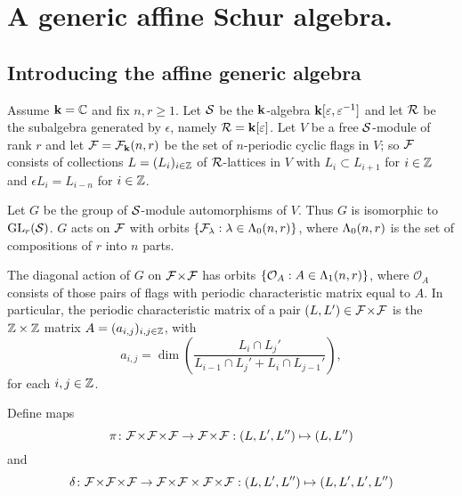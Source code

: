 \documentclass[a4paper, 11pt]{report}
\begin{document}
\chapter{A generic affine Schur algebra.}

\section{Introducing the affine generic algebra}

Assume $\mathbf{k} = \mathbb{C}$ and fix $n,r\geq 1$. Let $\mathcal{S}$ be the $\mathbf{k}$-algebra $\mathbf{k}[\varepsilon,\varepsilon^{-1}]$ and let $\mathcal{R}$ be the subalgebra generated by $\epsilon$, namely $\mathcal{R}=\mathbf{k}[\varepsilon]$. Let $V$ be a free $\mathcal{S}$-module of rank $r$ and let $\mathcal{F} = \mathcal{F}_{\mathbf{k}}(n,r)$ be the set of $n$-periodic cyclic flags in $V$; so $\mathcal{F}$ consists of collections $L = (L_i)_{i\in\mathbb{Z}}$ of $\mathcal{R}$-lattices in $V$ with $L_i\subset L_{i+1}$ for $i\in\mathbb{Z}$ and $\epsilon L_i = L_{i-n}$ for $i\in\mathbb{Z}$.

Let $G$ be the group of $\mathcal{S}$-module automorphisms of $V$. Thus $G$ is isomorphic to $\operatorname{GL}_{r}(\mathcal{S})$. $G$ acts on $\mathcal{F}$ with orbits $\{\mathcal{F}_\lambda:\lambda\in\Lambda_0(n,r)\}$, where $\Lambda_0(n,r)$ is the set of compositions of $r$ into $n$ parts.

The diagonal action of $G$ on ${\mathcal{F}\!\times\!\mathcal{F}}$ has orbits $\{\mathcal{O}_A:A\in\Lambda_1(n,r)\}$, where $\mathcal{O}_A$ consists of those pairs of flags with {\color{blue}periodic characteristic matrix} equal to $A$. In particular, the periodic characteristic matrix of a pair $(L,L')\in{\mathcal{F}\!\times\!\mathcal{F}}$ is the $\mathbb{Z}\times\mathbb{Z}$ matrix $A = (a_{i,j})_{i,j\in\mathbb{Z}}$, with
\begin{equation*}
a_{i,j} = \dim\left(\frac{L_i\cap L_j'}{L_{i-1}\cap L_j' + L_i\cap L_{j-1}'}\right),
\end{equation*}
for each $i,j\in\mathbb{Z}$.


\dashedline

Define maps
\begin{equation*}
\pi\colon {\mathcal{F}\!\times\!\mathcal{F}\!\times\!\mathcal{F}}\to{\mathcal{F}\!\times\!\mathcal{F}}: (L,L',L'')\mapsto (L,L'')
\end{equation*}
and
\begin{equation*}
\delta\colon \triflags\to\dblflags\times\dblflags: (L,L',L'')\mapsto (L,L',L',L'')
\end{equation*}
\end{document}
